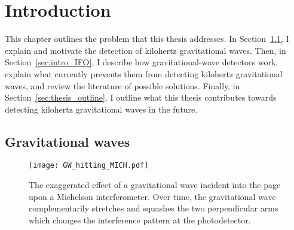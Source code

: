 \chapter{Introduction} %
\label{chp:introduction}





This chapter outlines the problem that this thesis addresses. In Section~\ref{sec:gravWaves}, I explain and motivate the detection of kilohertz gravitational waves. Then, in Section~\ref{sec:intro_IFO}, I describe how gravitational-wave detectors work, explain what currently prevents them from detecting kilohertz gravitational waves, and review the literature of possible solutions. Finally, in Section~\ref{sec:thesis_outline}, I outline what this thesis contributes towards detecting kilohertz gravitational waves in the future.


\section{Gravitational waves}
\label{sec:gravWaves}

\begin{figure}
	\centering
	\texttt{[image: GW\_hitting\_MICH.pdf]}
	\caption{The exaggerated effect of a gravitational wave incident into the page upon a Michelson interferometer. Over time, the gravitational wave complementarily stretches and squashes the two perpendicular arms which changes the interference pattern at the photodetector.}
	\label{fig:GW_incident_Michelson}
\end{figure}

